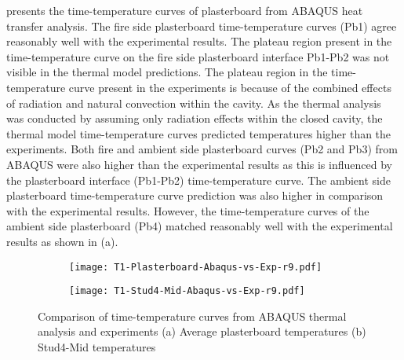  presents the time-temperature curves of plasterboard from ABAQUS heat transfer analysis. The fire side plasterboard time-temperature curves (Pb1) agree reasonably well with the experimental results. The plateau region present in the time-temperature curve on the fire side plasterboard interface Pb1-Pb2 was not visible in the thermal model predictions. The plateau region in the time-temperature curve present in the experiments is because of the combined effects of radiation and natural convection within the cavity. As the thermal analysis was conducted by assuming only radiation effects within the closed cavity, the thermal model time-temperature curves predicted temperatures higher than the experiments. Both fire and ambient side plasterboard curves (Pb2 and Pb3) from ABAQUS were also higher than the experimental results as this is influenced by the plasterboard interface (Pb1-Pb2) time-temperature curve. The ambient side plasterboard time-temperature curve prediction was also higher in comparison with the experimental results. However, the time-temperature curves of the ambient side plasterboard (Pb4) matched reasonably well with the experimental results as shown in  (a).
\begin{figure}[!htbp]
	\centering
	\begin{subfigure}[b]{0.7\textwidth}
		\centering
		\texttt{[image: T1-Plasterboard-Abaqus-vs-Exp-r9.pdf]}
		\caption{}
		\label{subfig:T1-Plasterboard-Abaqus-vs-Exp-r9}
	\end{subfigure}
	\begin{subfigure}[b]{0.6\textwidth}
		\centering
		\texttt{[image: T1-Stud4-Mid-Abaqus-vs-Exp-r9.pdf]}
		\caption{}
		\label{subfig:T1-Stud4-Mid-Abaqus-vs-Exp-r9}
	\end{subfigure}
	   \caption{Comparison of time-temperature curves from ABAQUS thermal analysis and experiments (a) Average plasterboard temperatures (b) Stud4-Mid temperatures}
	   \label{fig:abaqus-output-pb-studs}
\end{figure}

